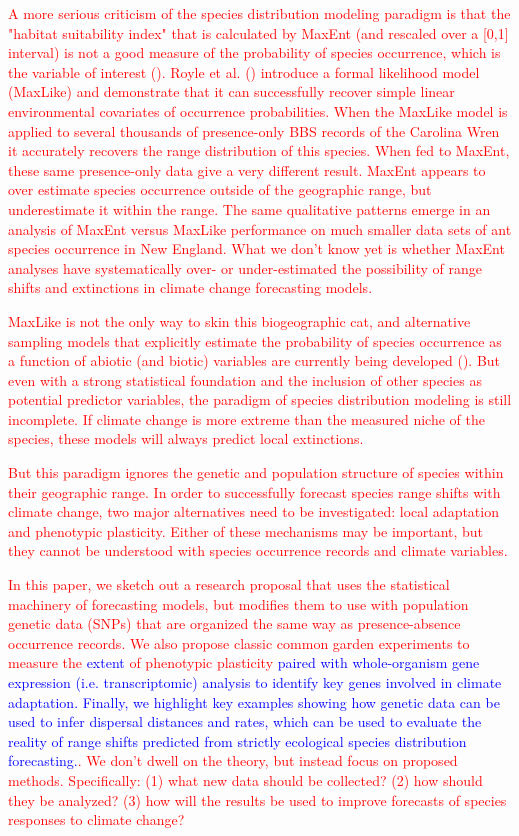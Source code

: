 \documentclass{article}
\newcommand{\Jtxt}[1]{\textcolor{blue}{#1}}
\newcommand{\Ntxt}[1]{\textcolor{red}{#1}}
\begin{document}
\Ntxt{A more serious criticism of the species distribution modeling paradigm is that the "habitat suitability index" that is calculated by MaxEnt (and rescaled over a [0,1] interval) is not a good measure of the probability of species occurrence, which is the variable of interest (). Royle et al. () introduce a formal likelihood model (MaxLike) and demonstrate that it can successfully recover simple linear environmental covariates of occurrence probabilities. When the MaxLike model is applied to several thousands of presence-only BBS records of the Carolina Wren it accurately recovers the range distribution of this species. When fed to MaxEnt, these same presence-only data give a very different result. MaxEnt appears to over estimate species occurrence outside of the geographic range, but underestimate it within the range. The same qualitative patterns emerge in an analysis of  MaxEnt versus MaxLike performance on much smaller data sets of ant species occurrence in New England. What we don't know yet is whether MaxEnt analyses have systematically over- or under-estimated the possibility of range shifts and extinctions in climate change forecasting models.}

\Ntxt{MaxLike is not the only way to skin this biogeographic cat, and alternative sampling models that explicitly estimate the probability of species occurrence as a function of abiotic (and biotic) variables are currently being developed (). But even with a strong statistical foundation and the inclusion of other species as potential predictor variables, the paradigm of species distribution modeling is still incomplete. If climate change is more extreme than the measured niche of the species, these models will always predict local extinctions.}

\Ntxt{But this paradigm ignores the genetic and population structure of species within their geographic range. In order to successfully forecast species range shifts with climate change, two major alternatives need to be investigated: local adaptation and phenotypic plasticity. Either of these mechanisms may be important, but they cannot be understood with species occurrence records and climate variables.}

\Ntxt{In this paper, we sketch out a research proposal that uses the statistical machinery of forecasting models, but modifies them to use with population genetic data (SNPs) that are organized the same way as presence-absence occurrence records. We also propose classic common garden experiments to measure the \Jtxt{extent} of phenotypic plasticity \Jtxt{paired with whole-organism gene expression (i.e. transcriptomic) analysis to identify key genes involved in climate adaptation. Finally, we highlight key examples showing how genetic data can be used to infer dispersal distances and rates, which can be used to evaluate the reality of range shifts predicted from strictly ecological species distribution forecasting.}. We don't dwell on the theory, but instead focus on proposed methods. Specifically: (1) what new data should be collected? (2) how should they be analyzed? (3) how will the results be used to improve forecasts of species responses to climate change?}
\end{document}

